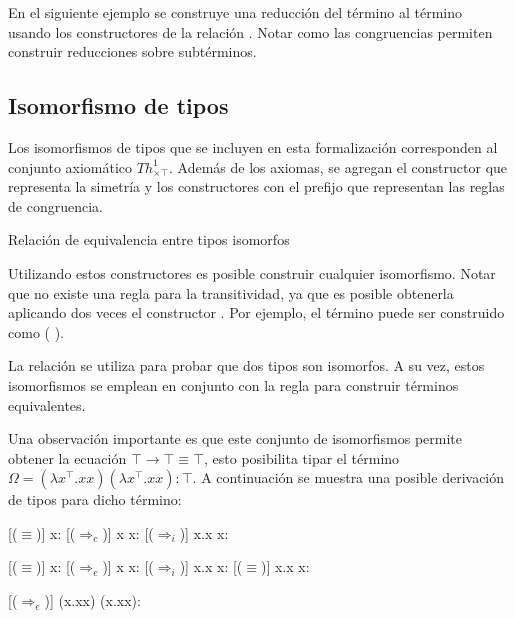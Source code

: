 \begin{example}
	En el siguiente ejemplo se construye una reducción del término  al término ~ usando los constructores de la relación \type{$\_\hookrightarrow\_$}.
	Notar como las congruencias permiten construir reducciones sobre subtérminos.
\end{example}

\subsection{Isomorfismo de tipos}

Los isomorfismos de tipos que se incluyen en esta formalización corresponden al conjunto axiomático $Th^1_{\times\top}$.
Además de los axiomas, se agregan el constructor  que representa la simetría y los constructores con el prefijo  que representan las reglas de congruencia.

\begin{codigo}
	Relación de equivalencia entre tipos isomorfos
	
\end{codigo}
Utilizando estos constructores es posible construir cualquier isomorfismo.
Notar que no existe una regla para la transitividad, ya que es posible obtenerla aplicando dos veces el constructor \const{$[\_]\equiv\_$}.
Por ejemplo, el término \const{[ trans}   \const{]$\equiv$}  puede ser construido como \const{[}  \const{]$\equiv$} (\const{[}  \const{]$\equiv$} ).

\begin{example}
	La relación \type{$\_\equiv\_$} se utiliza para probar que dos tipos son isomorfos.
	A su vez, estos isomorfismos se emplean en conjunto con la regla \const{$[\_]\equiv\_$} para construir términos equivalentes.
\end{example}

Una observación importante es que este conjunto de isomorfismos permite obtener la ecuación $\top \rightarrow \top \equiv \top$, esto posibilita tipar el término $\Omega = (\lambda x^\top.xx)(\lambda x^\top.xx): \top$.
A continuación se muestra una posible derivación de tipos para dicho término:

\begin{prooftree*}
	[($\equiv$)]{ \Gamma\vdash x: \top \rightarrow \top }
	[($\Rightarrow_e$)]{ \Gamma\vdash x x: \top }
	[($\Rightarrow_i$)]{ \Gamma\vdash \lambda x.x x: \top \rightarrow \top }
	
	[($\equiv$)]{ \Gamma\vdash x: \top \rightarrow \top }
	[($\Rightarrow_e$)]{ \Gamma\vdash x x: \top }
	[($\Rightarrow_i$)]{ \Gamma\vdash \lambda x.x x: \top \rightarrow \top }
	[($\equiv$)]{ \Gamma\vdash \lambda x.x x: \top }
	
	[($\Rightarrow_e$)]{ \Gamma\vdash (\lambda x.xx) (\lambda x.xx): \top }	
\end{prooftree*}

